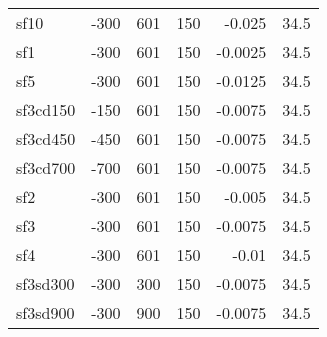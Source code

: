 \begin{tabular}{lrrrrr}
 sf10              &                                             -300 &                         601 &                   150 &                                           -0.025  &                            34.5 \\
 sf1               &                                             -300 &                         601 &                   150 &                                           -0.0025 &                            34.5 \\
 sf5               &                                             -300 &                         601 &                   150 &                                           -0.0125 &                            34.5 \\
 sf3cd150          &                                             -150 &                         601 &                   150 &                                           -0.0075 &                            34.5 \\
 sf3cd450          &                                             -450 &                         601 &                   150 &                                           -0.0075 &                            34.5 \\
 sf3cd700          &                                             -700 &                         601 &                   150 &                                           -0.0075 &                            34.5 \\
 sf2               &                                             -300 &                         601 &                   150 &                                           -0.005  &                            34.5 \\
 sf3               &                                             -300 &                         601 &                   150 &                                           -0.0075 &                            34.5 \\
 sf4               &                                             -300 &                         601 &                   150 &                                           -0.01   &                            34.5 \\
 sf3sd300          &                                             -300 &                         300 &                   150 &                                           -0.0075 &                            34.5 \\
 sf3sd900          &                                             -300 &                         900 &                   150 &                                           -0.0075 &                            34.5 \\

\end{tabular}
